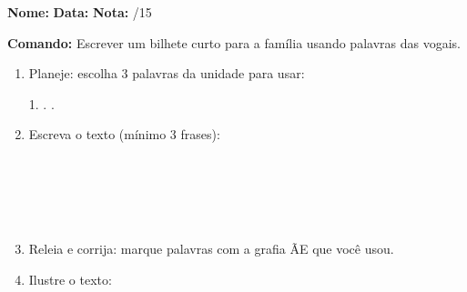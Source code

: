 \begin{exercicio}

\noindent\textbf{Nome:} \underline{\hspace{3.2cm}} \quad \textbf{Data:} \underline{\hspace{1.6cm}} \quad \textbf{Nota:} \underline{\hspace{0.9cm}}/15


\noindent\textbf{Comando:} Escrever um bilhete curto para a família usando palavras das vogais.


\begin{enumerate}

  \item Planeje: escolha 3 palavras da unidade para usar:
  \begin{center}
  1. \underline{\hspace{3cm}} . \underline{\hspace{3cm}} . \underline{\hspace{3cm}}
  \end{center}

  \item Escreva o texto (mínimo 3 frases):
  \begin{center}
  \underline{\hspace{12cm}}\\\underline{\hspace{12cm}}\\\underline{\hspace{12cm}}\\\underline{\hspace{12cm}}\\\underline{\hspace{12cm}}
  \end{center}

  \item Releia e corrija: marque palavras com a grafia ÃE que você usou.

  \item Ilustre o texto:
  \begin{center}
  \end{center}

\end{enumerate}

\end{exercicio}


